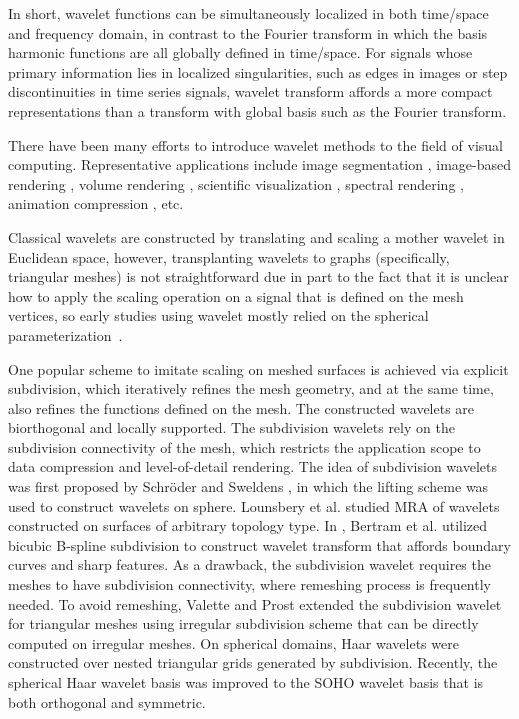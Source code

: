 In short, wavelet functions can be simultaneously localized in both time/space and frequency domain,
in contrast to the Fourier transform in which the basis harmonic functions are all globally defined
in time/space. For signals whose primary information lies in localized singularities, such as edges
in images or step discontinuities in time series signals, wavelet transform affords a more compact
representations than a transform with global basis such as the Fourier transform.

There have been many efforts to introduce wavelet methods to the field of visual computing.
Representative applications include image segmentation \cite{Figueiredo:2005:CVPR},
image-based rendering \cite{Overbeck:2009:TOG}, volume rendering \cite{Lippert:1995},
scientific visualization \cite{Cracium:2005:TVCG}, spectral rendering \cite{Iehl:2000:CGF},
animation compression \cite{Payan:2007:CG}, etc.

Classical wavelets are constructed by translating and scaling a mother wavelet in Euclidean
space, however, transplanting wavelets to graphs (specifically,
triangular meshes) is not straightforward due in part to the fact that
it is unclear how to apply the scaling operation on a signal that is
defined on the mesh vertices, so early studies using wavelet mostly
relied on the spherical parameterization~\cite{Werghi:2002,Liu:2007}.

One popular scheme to imitate scaling on meshed surfaces is achieved via explicit subdivision,
which iteratively refines the mesh geometry, and at the same time, also refines the functions
defined on the mesh. The constructed wavelets are biorthogonal and locally supported.
The subdivision wavelets rely on the subdivision connectivity of the mesh, which restricts the
application scope to data compression and level-of-detail rendering. The idea of subdivision
wavelets was first proposed by Schr\"{o}der and Sweldens \cite{Schroder:1995:SIGGRAPH}, in
which the lifting scheme was used to construct wavelets on sphere.
Lounsbery et al. \cite{Lounsbery:1997:TOG} studied MRA of wavelets constructed on surfaces
of arbitrary topology type. In \cite{Bertram:2000:vis}, Bertram et al. utilized bicubic
B-spline subdivision to construct wavelet transform that affords boundary curves and sharp
features. As a drawback, the subdivision wavelet
requires the meshes to have subdivision connectivity, where remeshing process is frequently
needed. To avoid remeshing, Valette and Prost \cite{Valette:2004:TVCG} extended the subdivision
wavelet for triangular meshes using irregular subdivision scheme that can be directly computed
on irregular meshes. On spherical domains, Haar wavelets \cite{Nielson:1997:vis,Bonneau:1999:vis}
were constructed over nested triangular grids generated by subdivision. Recently, the spherical
Haar wavelet basis was improved to the SOHO wavelet basis \cite{Lessig:2008:TOG} that is both
orthogonal and symmetric.

